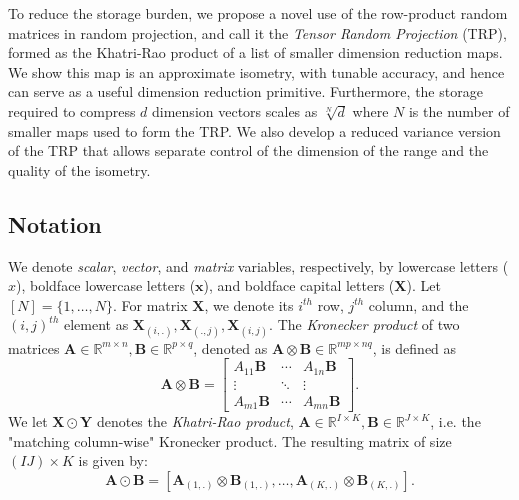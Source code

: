 To reduce the storage burden, we propose a novel use of the row-product random matrices in random projection, and call it the \textit{Tensor Random Projection} (TRP),
formed as the Khatri-Rao product of a list of smaller dimension reduction maps.
We show this map is an approximate isometry, with tunable accuracy,
and hence can serve as a useful dimension reduction primitive.
Furthermore, the storage required to compress $d$ dimension vectors scales as $\sqrt[N]d$
where $N$ is the number of smaller maps used to form the TRP.
We also develop a reduced variance version of the TRP that allows separate control
of the dimension of the range and the quality of the isometry.





\subsection{Notation}
We denote \textit{scalar}, \textit{vector}, and \textit{matrix} variables, respectively,
by lowercase letters ($x$), boldface lowercase letters ($\mathbf{x}$),
and boldface capital letters  ($\mathbf{X}$).
Let $[N] = \{1, \dots, N\}$.
For matrix $\mathbf{X}$, we denote its $i^{th}$ row, $j^{th}$ column, and the $(i,j)^{th}$ element as $\mathbf{X}_{(i,.)}, \mathbf{X}_{(.,j)}, \mathbf{X}_{(i,j)}$. The \textit{Kronecker product} of two matrices $\mathbf{A}\in \mathbb{R}^{m\times n},\mathbf{B} \in \mathbb{R}^{p\times q}$, denoted as $\mathbf{A} \otimes \mathbf{B} \in \mathbb{R}^{mp\times nq}$, is defined as 
\[
\mathbf{A} \otimes \mathbf{B} = \left[
\begin{array}{ccc}
A_{11}\mathbf{B}   & \cdots & A_{1n}\mathbf{B} \\
\vdots & \ddots & \vdots \\
A_{m1}\mathbf{B} & \cdots &   A_{mn}\mathbf{B}
\end{array}
\right].
\]
We let $\mathbf{X} \odot \mathbf{Y}$ denotes the \textit{Khatri-Rao product}, $\mathbf{A} \in \mathbb{R}^{I \times K}, \mathbf{B} \in \mathbb{R}^{J \times K}$, i.e. the "matching column-wise" Kronecker product. The resulting matrix of size $(IJ) \times K$ is given by: 
\begin{equation}\label{khatri-rao}
\mathbf{A} \odot \mathbf{B} = [\mathbf{A}_{(1,.)} \otimes \mathbf{B}_{(1,.)}, \dots, \mathbf{A}_{(K, .)} \otimes \mathbf{B}_{(K,.)}].
\end{equation}
